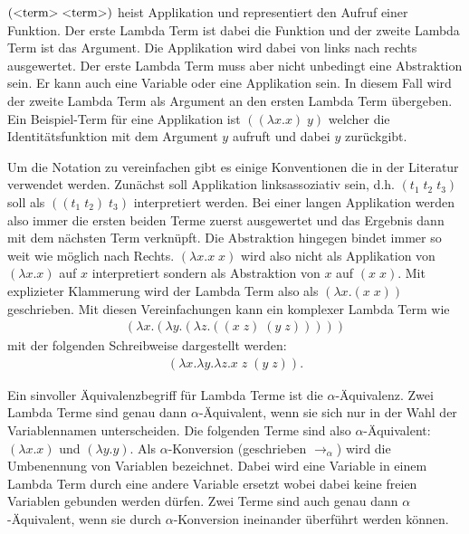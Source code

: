 \documentclass[ngerman]{article}
\newcommand{\doublelinebreak}{\par\vspace{\baselineskip}}
\begin{document}
$(\text{\textless term\textgreater} \; \text{\textless term\textgreater})$ heist Applikation und representiert den Aufruf einer Funktion. Der erste Lambda Term ist dabei die Funktion und der zweite Lambda Term ist das Argument. Die Applikation wird dabei von links nach rechts ausgewertet. Der erste Lambda Term muss aber nicht unbedingt eine Abstraktion sein. Er kann auch eine Variable oder eine Applikation sein. In diesem Fall wird der zweite Lambda Term als Argument an den ersten Lambda Term übergeben. Ein Beispiel-Term für eine Applikation ist $((\lambda x.x) \; y)$ welcher die Identitätsfunktion mit dem Argument $y$ aufruft und dabei $y$ zurückgibt.

\doublelinebreak
Um die Notation zu vereinfachen gibt es einige Konventionen die in der Literatur verwendet werden.
Zunächst soll Applikation linksassoziativ sein, d.h. $(t_1 \; t_2 \; t_3)$ soll als $((t_1 \; t_2) \; t_3)$ interpretiert werden. Bei einer langen Applikation werden also immer die ersten beiden Terme zuerst ausgewertet und das Ergebnis dann mit dem nächsten Term verknüpft. Die Abstraktion hingegen bindet immer so weit wie möglich nach Rechts. $(\lambda x.x \; x)$ wird also nicht als Applikation von $(\lambda x.x)$ auf $x$ interpretiert sondern als Abstraktion von $x$ auf $(x \; x)$. Mit explizieter Klammerung wird der Lambda Term also als $(\lambda x.(x \; x))$ geschrieben. Mit diesen Vereinfachungen kann ein komplexer Lambda Term wie
\begin{align*}
    (\lambda x.(\lambda y.(\lambda z.((x \; z) \; (y \; z)))))
\end{align*}
mit der folgenden Schreibweise dargestellt werden:
\begin{align*}
    (\lambda x. \lambda y. \lambda z. x \; z \; (y \; z)).
\end{align*}

\doublelinebreak

Ein sinvoller Äquivalenzbegriff für Lambda Terme ist die $\alpha$-Äquivalenz. Zwei Lambda Terme sind genau dann $\alpha$-Äquivalent, wenn sie sich nur in der Wahl der Variablennamen unterscheiden. Die folgenden Terme sind also $\alpha$-Äquivalent: $(\lambda x.x)$ und $(\lambda y.y)$.
Als $\alpha$-Konversion (geschrieben $\rightarrow_\alpha$) wird die Umbenennung von Variablen bezeichnet. Dabei wird eine Variable in einem Lambda Term durch eine andere Variable ersetzt wobei dabei keine freien Variablen gebunden werden dürfen. Zwei Terme sind auch genau dann $\alpha$-Äquivalent, wenn sie durch $\alpha$-Konversion ineinander überführt werden können.
\end{document}
